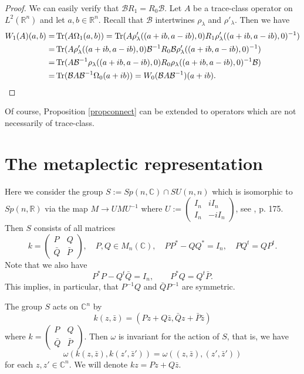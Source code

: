 \documentclass[12pt]{amsart}
\numberwithin{equation}{section}
\begin{document}
\begin{proof} We can easily verify that ${\mathcal B}R_1=R_0{\mathcal B}$. Let
$A$ be a trace-class operator on $L^2({\mathbb R}^{n})$ and let
$a, b\in {\mathbb R}^{n}$. Recall that $\mathcal B$ intertwines $\rho_{\lambda}$ and 
$\rho'_{\lambda}$. Then we have
\begin{align*}
W_1(A)(a,b)=&\operatorname{Tr}(A\Omega_1(a,b))=\operatorname{Tr}(A\rho'_{\lambda}((a+ib,a-ib),0)R_1\rho'_{\lambda}((a+ib,a-ib),0)^{-1})\\
=&\operatorname{Tr}(A\rho'_{\lambda}((a+ib,a-ib),0){\mathcal B}^{-1}R_0{\mathcal B}\rho'_{\lambda}((a+ib,a-ib),0)^{-1})\\
=&\operatorname{Tr}(A{\mathcal B}^{-1}\rho_{\lambda}((a+ib,a-ib),0)R_0\rho_{\lambda}((a+ib,a-ib),0)^{-1}{\mathcal B})\\
=&\operatorname{Tr} ({\mathcal B}A{\mathcal B}^{-1}\Omega_0(a+ib))=W_0({\mathcal B}A{\mathcal B}^{-1})(a+ib).
\end{align*}
\end{proof}

Of course, Proposition \ref{propconnect} can be extended to operators which are not
necessarily of trace-class.

\section{The metaplectic representation} \label{sec:4}

Here we consider the group $S:=Sp(n,{\mathbb C})\cap SU(n,n)$
which is isomorphic to $Sp(n,{\mathbb R})$ via the map $M\rightarrow UMU^{-1}$
where $U:=\left(\begin{smallmatrix} I_n&iI_n\\
I_n&-iI_n\end{smallmatrix}\right)$, see \cite{Fo}, p. 175.
Then $S$
consists of all matrices
\begin{equation*}k=\begin{pmatrix} P&Q\\
{\bar Q}&{\bar P}
\end{pmatrix}, \quad P,Q\in M_n({\mathbb C}),\quad PP^{\ast}-QQ^{\ast}=I_n,\quad PQ^t=QP^t.
\end{equation*}
Note that we also have
\begin{equation*}P^{\ast}P-Q^t{\bar Q}=I_n,\quad \quad P^{\ast}Q=Q^t{\bar P}.
\end{equation*}
This implies, in particular, that $P^{-1}Q$ and ${\bar Q}P^{-1}$ are symmetric.

The group $S$ acts on ${\mathbb C}^n$ by 
\begin{equation*}k(z,{\bar z})=(Pz+Q{\bar z},{\bar Q}z+{\bar P}{\bar z})\end{equation*}
where $k=\left(\begin{smallmatrix} P&Q\\
{\bar Q}&{\bar P}\end{smallmatrix}\right)$. Then $\omega$ is invariant for the action of $S$,
that is, we have
\begin{equation*}\omega (k(z,{\bar z}),k(z',{\bar z'}))=\omega ((z,{\bar z}),(z',{\bar z'}))
\end{equation*} for each $z,z'\in {\mathbb C}^n$. We will denote
$kz=Pz+Q{\bar z}$.
\end{document}
